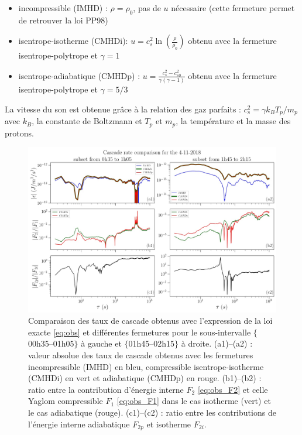 \begin{itemize}
    \item incompressible (IMHD) : $\rho = \rho_0$, pas de $u$ nécessaire (cette fermeture permet de retrouver la loi PP98)
    \item isentrope-isotherme (CMHDi): $u = c_s^2 \ln(\frac{\rho}{\rho_0})$ obtenu avec la fermeture isentrope-polytrope et $\gamma = 1$
    \item isentrope-adiabatique (CMHDp) : $u = \frac{c_s^2 -c_{s0}^2}{\gamma(\gamma -1)}$ obtenu avec la fermeture isentrope-polytrope et $\gamma = 5/3$
\end{itemize}
La vitesse du son est obtenue grâce à la relation des gaz parfaits : $c_s^2 = \gamma k_B T_p /m_p$ avec $k_B$, la constante de Boltzmann et $T_p$ et $m_p$, la température et la masse des protons. 
\begin{figure}[!ht]
 \centering
\includegraphics[width=\linewidth,trim=0cm 0cm 0cm 0cm, clip=false]{./Part_1/images/Fig_04112018H_00_results}
\caption{Comparaison des taux de cascade obtenus avec l'expression de la loi exacte \eqref{eq:obs} et différentes fermetures pour le sous-intervalle $\{$00h35–01h05$\}$ à gauche et $\{$01h45–02h15$\}$ à droite. (a1)–(a2) : valeur absolue des taux de cascade obtenus avec les fermetures incompressible (IMHD) en bleu, compressible isentrope-isotherme (CMHDi) en vert et adiabatique (CMHDp) en rouge. (b1)–(b2) : ratio entre la contribution d'énergie interne $F_2$ \eqref{eq:obs_F2} et celle Yaglom compressible $F_1$ \eqref{eq:obs_F1} dans le cas isotherme (vert) et le cas adiabatique (rouge). (c1)–(c2) : ratio entre les contributions de l'énergie interne adiabatique $F_{2p}$ et isotherme $F_{2i}$.}
\label{fig:loi_PSP}
\end{figure}

